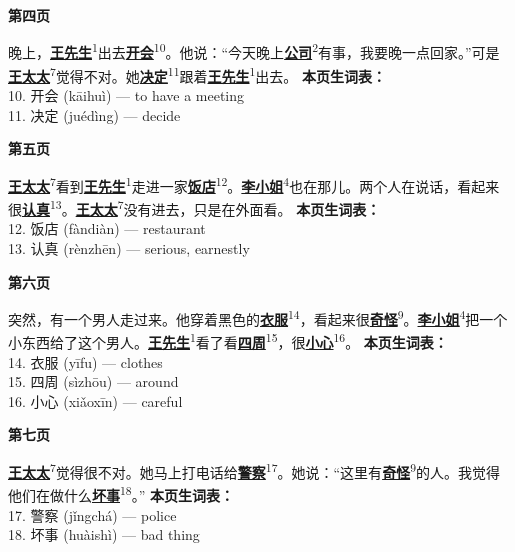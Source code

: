 \documentclass[20pt]{extarticle}
\newcommand{\glossedword}[2]{\uline{\textbf{#1}}\textsuperscript{#2}}
\begin{document}
\begin{center}
    {\fontsize{36}{44}\selectfont \textbf{第四页}}
\end{center}
\vspace{2em}
{\fontsize{22}{30}\selectfont
\noindent
晚上，\glossedword{王先生}{1}出去\glossedword{开会}{10}。他说：“今天晚上\glossedword{公司}{2}有事，我要晚一点回家。”可是\glossedword{王太太}{7}觉得不对。她\glossedword{决定}{11}跟着\glossedword{王先生}{1}出去。
}
\vfill
{\fontsize{18}{26}\selectfont
\noindent
\textbf{本页生词表：}\\[0.5em]
10. 开会 (kāihuì) — to have a meeting\\
11. 决定 (juédìng) — decide
}
\newpage

\begin{center}
    {\fontsize{36}{44}\selectfont \textbf{第五页}}
\end{center}
\vspace{2em}
{\fontsize{22}{30}\selectfont
\noindent
\glossedword{王太太}{7}看到\glossedword{王先生}{1}走进一家\glossedword{饭店}{12}。\glossedword{李小姐}{4}也在那儿。两个人在说话，看起来很\glossedword{认真}{13}。\glossedword{王太太}{7}没有进去，只是在外面看。
}
\vfill
{\fontsize{18}{26}\selectfont
\noindent
\textbf{本页生词表：}\\[0.5em]
12. 饭店 (fàndiàn) — restaurant\\
13. 认真 (rènzhēn) — serious, earnestly
}
\newpage

\begin{center}
    {\fontsize{36}{44}\selectfont \textbf{第六页}}
\end{center}
\vspace{2em}
{\fontsize{22}{30}\selectfont
\noindent
突然，有一个男人走过来。他穿着黑色的\glossedword{衣服}{14}，看起来很\glossedword{奇怪}{9}。\glossedword{李小姐}{4}把一个小东西给了这个男人。\glossedword{王先生}{1}看了看\glossedword{四周}{15}，很\glossedword{小心}{16}。
}
\vfill
{\fontsize{18}{26}\selectfont
\noindent
\textbf{本页生词表：}\\[0.5em]
14. 衣服 (yīfu) — clothes\\
15. 四周 (sìzhōu) — around\\
16. 小心 (xiǎoxīn) — careful
}
\newpage

\begin{center}
    {\fontsize{36}{44}\selectfont \textbf{第七页}}
\end{center}
\vspace{2em}
{\fontsize{22}{30}\selectfont
\noindent
\glossedword{王太太}{7}觉得很不对。她马上打电话给\glossedword{警察}{17}。她说：“这里有\glossedword{奇怪}{9}的人。我觉得他们在做什么\glossedword{坏事}{18}。”
}
\vfill
{\fontsize{18}{26}\selectfont
\noindent
\textbf{本页生词表：}\\[0.5em]
17. 警察 (jǐngchá) — police\\
18. 坏事 (huàishì) — bad thing
}
\newpage
\end{document}
